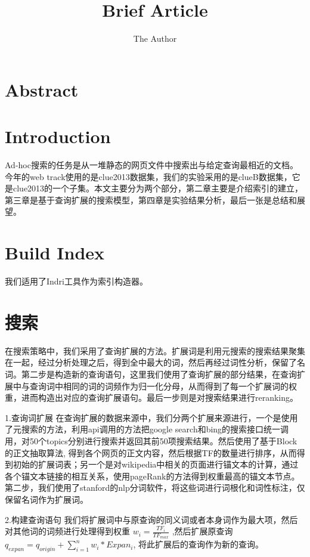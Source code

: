 \documentclass[11pt]{article} %
\title{Brief Article}
\author{The Author}
\begin{document}
\begin{CJK}{UTF8}{gkai}
\maketitle

\section{Abstract}


\section{Introduction}

Ad-hoc搜索的任务是从一堆静态的网页文件中搜索出与给定查询最相近的文档。今年的web track使用的是clue2013数据集，我们的实验采用的是clueB数据集，它是clue2013的一个子集。本文主要分为两个部分，第二章主要是介绍索引的建立，第三章是基于查询扩展的搜索模型，第四章是实验结果分析，最后一张是总结和展望。

\section{Build Index}
我们适用了Indri工具作为索引构造器。

\section{搜索}
在搜索策略中，我们采用了查询扩展的方法。扩展词是利用元搜索的搜索结果聚集在一起，经过分析处理之后，得到全中最大的词，然后再经过词性分析，保留了名词。第二步是构造新的查询语句，这里我们使用了查询扩展的部分结果，在查询扩展中与查询词中相同的词的词频作为归一化分母，从而得到了每一个扩展词的权重，进而构造出对应的查询扩展语句。最后一步则是对搜索结果进行reranking。

1.查询词扩展
在查询扩展的数据来源中，我们分两个扩展来源进行，一个是使用了元搜索的方法，利用api调用的方法把google search和bing的搜索接口统一调用，对50个topics分别进行搜索并返回其前50项搜索结果。然后使用了基于Block的正文抽取算法\cite{2012-Lin-p256-264}, 得到各个网页的正文内容，然后根据TF的数量进行排序，从而得到初始的扩展词表；另一个是对wikipedia中相关的页面进行锚文本的计算，通过各个锚文本链接的相互关系，使用pageRank的方法得到权重最高的锚文本节点。
第二步，我们使用了stanford的nlp分词软件，将这些词进行词根化和词性标注，仅保留名词作为扩展词。


2.构建查询语句
我们将扩展词中与原查询的同义词或者本身词作为最大项，然后对其他词的词频进行处理得到权重 $w_i = \frac{TF_i}{TF_{max}}$ ,然后扩展原查询 $q_{expan} = q_{origin} + \sum^n_{i=1}w_i*Expan_i$, 将此扩展后的查询作为新的查询。


\end{CJK}
\end{document}
